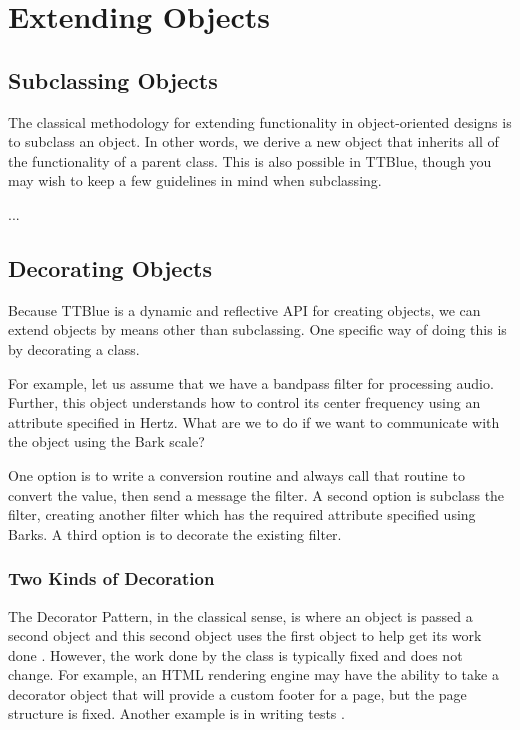 \chapter{Extending Objects}

\section{Subclassing Objects}

The classical methodology for extending functionality in object-oriented designs is to subclass an object.
In other words, we derive a new object that inherits all of the functionality of a parent class.
This is also possible in TTBlue, though you may wish to keep a few guidelines in mind when subclassing.

...



\section{Decorating Objects}
\label{decorating_objects}

Because TTBlue is a dynamic and reflective API for creating objects, we can extend objects by means other than subclassing.
One specific way of doing this is by decorating a class.

For example, let us assume that we have a bandpass filter for processing audio.
Further, this object understands how to control its center frequency using an attribute specified in Hertz.
What are we to do if we want to communicate with the object using the Bark scale?

One option is to write a conversion routine and always call that routine to convert the value, then send a message the filter.
A second option is subclass the filter, creating another filter which has the required attribute specified using Barks.
A third option is to decorate the existing filter.


\subsection{Two Kinds of Decoration}

The Decorator Pattern, in the classical sense, is where an object is passed a second object and this second object uses the first object to help get its work done \cite{gang of four, page?}.  However, the work done by the class is typically fixed and does not change.  For example, an HTML rendering engine may have the ability to take a decorator object that will provide a custom footer for a page, but the page structure is fixed.  Another example is in writing tests \cite{shalloway and trott, page 307}.

